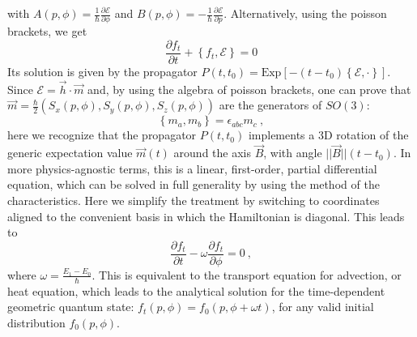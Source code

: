 \documentclass[draft,nofootinbib,pre,twocolumn,showpacs,showkeys,preprintnumbers,floatfix]{revtex4-1}
\newcommand{\1}{\mathbbm{1}}
\begin{document}
with $A(p,\phi) = \frac{1}{\hbar}\frac{\partial \mathcal{E}}{\partial \phi}$ and $B(p,\phi) = - \frac{1}{\hbar}\frac{\partial \mathcal{E}}{\partial p}$.
Alternatively, using the poisson brackets, we get
\begin{equation}
\frac{\partial f_t}{\partial t} + \left\{ f_t, \mathcal{E}\right\} = 0
\end{equation}
Its solution is given by the propagator $P(t,t_0) = \mathrm{Exp}\left[ - (t-t_0)\left\{\mathcal{E}, \cdot \right\} \right]$.
Since $\mathcal{E}= \vec{h} \cdot \vec{m}$ and, by using the algebra of poisson brackets,
one can prove that $\vec{m} = \frac{\hbar}{2}\left( S_x(p,\phi),S_y(p,\phi),S_z(p,\phi)\right)$ are the generators of $SO(3)$:
\begin{equation}
\left\{ m_a, m_b\right\} = \epsilon_{abc} m_c~,
\end{equation}
 here we recognize that the propagator $P(t,t_0)$ implements a 3D rotation of the generic 
expectation value $\vec{m}(t)$ around the axis $\vec{B}$, with angle $||\vec{B}||(t - t_0)$. 
In more physics-agnostic terms, this is a linear, first-order, partial differential equation, which can be solved 
in full generality by using the method of the characteristics. Here we simplify the treatment 
by switching to coordinates aligned to the convenient basis in which the Hamiltonian 
is diagonal. This leads to
\begin{equation}
\frac{\partial f_t}{\partial t} - \omega \frac{\partial f_t}{\partial \phi} = 0~,
\end{equation}
where $\omega = \frac{E_1 - E_0}{\hbar}$. This is equivalent to the transport 
equation for advection, or heat equation, which leads to the analytical solution for the 
time-dependent geometric quantum state: $f_t(p,\phi) = f_0(p,\phi+\omega t)$, for any 
valid initial distribution $f_0(p,\phi)$.
\end{document}
